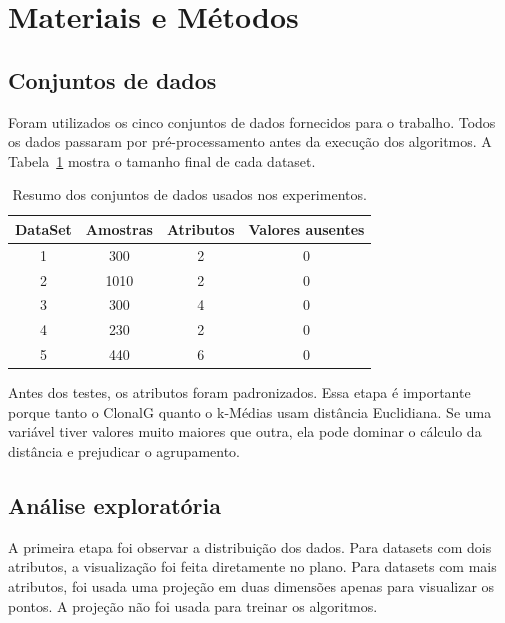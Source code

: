\documentclass[12pt,a4paper]{article}
\begin{document}
\section{Materiais e Métodos}

\subsection{Conjuntos de dados}

Foram utilizados os cinco conjuntos de dados fornecidos para o trabalho. Todos os dados passaram por pré-processamento antes da execução dos algoritmos. A Tabela~\ref{tab:dados} mostra o tamanho final de cada dataset.

\begin{table}[H]
\centering
\caption{Resumo dos conjuntos de dados usados nos experimentos.}
\label{tab:dados}
\begin{tabular}{cccc}
\toprule
DataSet & Amostras & Atributos & Valores ausentes \\
\midrule
1 & 300 & 2 & 0 \\
2 & 1010 & 2 & 0 \\
3 & 300 & 4 & 0 \\
4 & 230 & 2 & 0 \\
5 & 440 & 6 & 0 \\
\bottomrule
\end{tabular}
\end{table}

Antes dos testes, os atributos foram padronizados. Essa etapa é importante porque tanto o ClonalG quanto o k-Médias usam distância Euclidiana. Se uma variável tiver valores muito maiores que outra, ela pode dominar o cálculo da distância e prejudicar o agrupamento.

\subsection{Análise exploratória}

A primeira etapa foi observar a distribuição dos dados. Para datasets com dois atributos, a visualização foi feita diretamente no plano. Para datasets com mais atributos, foi usada uma projeção em duas dimensões apenas para visualizar os pontos. A projeção não foi usada para treinar os algoritmos.
\end{document}
